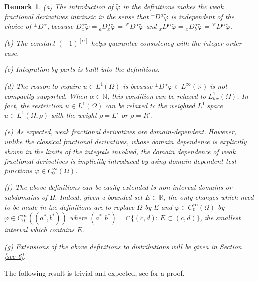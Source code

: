 \documentclass[leqno,final]{siamltex}
\numberwithin{equation}{section}
\newtheorem{remark}{Remark}[section]
\renewcommand{\(}{\bigl(}
\renewcommand{\)}{\bigr)}
\newcommand{\R}{\mathbb{R}}
\newcommand{\N}{\mathbb{N}}
\begin{document}
    \begin{remark}
       (a) The introduction of $\tilde{\varphi}$ in the definitions makes the weak fractional derivatives intrinsic 
       in the sense that ${^{\pm}}{D}{}^{\alpha} \tilde{\varphi}$ is independent of the choice of ${^{\pm}}{D}{}^{\alpha}$, because 
       ${ }{D}{^{\alpha}_{x}}\tilde{\varphi}={_{a}}{D}{^{\alpha}_{x}}\tilde{\varphi}= {^{\mathcal{F}}}{D}{^{\alpha}}\tilde{\varphi}$ and  
       ${_{x}}{D}{^{\alpha} }\tilde{\varphi}={_{x}}{D}{^{\alpha}_{b}}\tilde{\varphi}= {^{\mathcal{F}}}{D}{^{\alpha}}\tilde{\varphi}$.
       
       (b) The constant $(-1)^{[\alpha]}$ helps guarantee consistency with the integer order case. 
       
      (c) Integration by parts is built into the definitions.
       
      (d) The reason to require $u \in L^{1}(\Omega)$ is because ${^{\pm}}{D}{^{\alpha}} \tilde{\varphi} \in L^{\infty}(\R)$  
       is not compactly supported. When $\alpha \in \N$, this condition can be relaxed to $L^{1}_{loc}(\Omega)$. In fact, the restriction $u \in L^{1}(\Omega)$ can be relaxed to the weighted $L^1$ space 
       $u\in L^1(\Omega, \rho)$ with the weight $\rho=L'$ or $\rho=R'$.
       
       (e)  As expected, weak fractional derivatives are {\em domain-dependent}. 
       	However, unlike 
       the classical fractional derivatives, whose domain dependence is explicitly shown in the limits of the integrals
       involved, the domain dependence of weak fractional derivatives is implicitly introduced by using 
       domain-dependent test functions $\varphi\in C^\infty_0(\Omega)$.  
       
      (f)  The above definitions can be easily extended to non-interval domains or subdomains of $\Omega$.  Indeed, given  a bounded set $E\subset \R$,  the 
      only changes which need  to be made in the definitions are to replace $\Omega$ by $E$ and $\varphi\in C^\infty_0(\Omega)$  by  $\varphi\in C^\infty_0((a^*, b^*))$  where $(a^*,b^*) =\cap\{(c,d):\, E\subset (c,d)\}$,
       the smallest interval which contains $E$.
    
       (g) Extensions of the above definitions to distributions will be given in Section \ref{sec-6}.
      \end{remark}

\smallskip
 The following result is trivial and expected, see \cite[Theorem 2.5]{Feng_Sutton}
	for a proof. 
\end{document}
